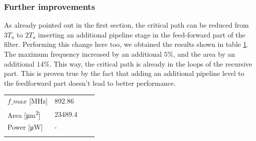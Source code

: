 \documentclass[a4paper]{article}
\begin{document}
\subsubsection{Further improvements}
As already pointed out in the first section, the critical path can be reduced from $3T_a$ to $2T_a$ inserting an additional pipeline stage in the feed-forward part of the filter. Performing this change here too, we obtained the results shown in table \ref{tab:ret_res_opt}. The maximum frequency increased by an additional $5\%$, and the area by an additional $14\%$. This way, the critical path is already in the loops of the recursive part. This is proven true by the fact that adding an additional pipeline level to the feedforward part doesn't lead to better performance.

\begin{table}[hbtp]
	\centering
	\begin{tabular}{|l|l|ll} 
	\cline{1-2}
	$f\_max$ [\si{\mega\hertz}{}]           & 892.86               &  &   \\ 
	\cline{1-2}
	Area [\si{\micro\meter^2}{}]                & 23489.4              &  &   \\ 
	\cline{1-2}
	Power [\si{\micro\watt}{}]               & -                    &  &   \\ 
	\cline{1-2}
	\multicolumn{1}{l}{} & \multicolumn{1}{l}{} &  &  
	\end{tabular}
	\label{tab:ret_res_opt}
\end{table}
\end{document}

